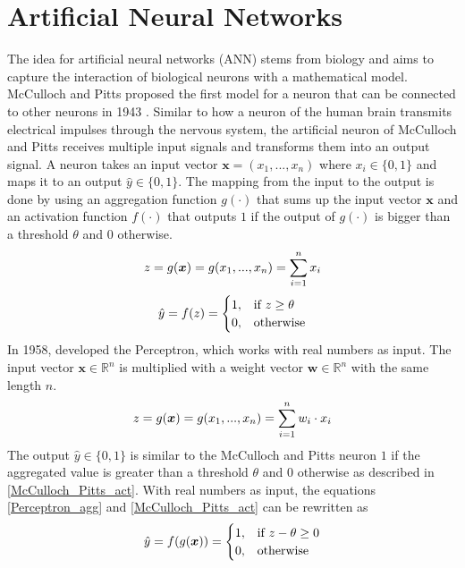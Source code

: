 \section{Artificial Neural Networks}
The idea for artificial neural networks (ANN) stems from biology and aims to capture the interaction of biological neurons with a mathematical model.
McCulloch and Pitts proposed the first model for a neuron that can be connected to other neurons in 1943 .
Similar to how a neuron of the human brain transmits electrical impulses through the nervous system, the artificial neuron of McCulloch and Pitts receives multiple input signals and transforms them into an output signal.
A neuron takes an input vector $\boldsymbol{x} = (x_1, ..., x_n)$ where $x_i \in \{0, 1\}$ and maps it to an output $\hat{y} \in \{0, 1\}$.
The mapping from the input to the output is done by using an aggregation function $g(\cdot)$ that sums up the input vector $\boldsymbol{x}$ and an activation function $f(\cdot)$ that outputs $1$ if the output of $g(\cdot)$ is bigger than a threshold $\theta$ and $0$ otherwise.
%
\begin{align}\eqlbl{McCulloch_Pitts_agg}%
	z = g(\boldsymbol{x}) = g(x_1, ..., x_n) = \sum_{i=1}^{n}x_i\\
\end{align}
%
\begin{align}\eqlbl{McCulloch_Pitts_act}%
		\hat{y} = f(z) = \begin{cases}
      		1, & \text{if}\ z \geq \theta \\
      		0, & \text{otherwise}
    	\end{cases}
\end{align}
%
In 1958,  developed the Perceptron, which works with real numbers as input.
The input vector $\boldsymbol{x} \in \mathbb{R}^n$ is multiplied with a weight vector $\boldsymbol{w} \in \mathbb{R}^n$ with the same length $n$.
%
\begin{align}\eqlbl{Perceptron_agg}%
	z = g(\boldsymbol{x}) = g(x_1, ..., x_n) = \sum_{i=1}^{n} w_i \cdot x_i\\
\end{align}
%
The output $\hat{y} \in \{0, 1\}$ is similar to the McCulloch and Pitts neuron $1$ if the aggregated value is greater than a threshold $\theta$ and $0$ otherwise as described in \eqref{McCulloch_Pitts_act}. With real numbers as input, the equations \eqref*{Perceptron_agg} and \eqref*{McCulloch_Pitts_act} can be rewritten as
%
\begin{align}\eqlbl{Perceptron}%
		\hat{y} =f(g(\boldsymbol{x})) = \begin{cases}
      		1, & \text{if}\ z - \theta \geq 0 \\
      		0, & \text{otherwise}
    	\end{cases}
\end{align}
